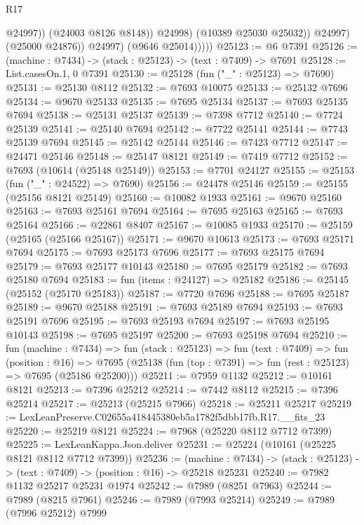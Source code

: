 \begin{lexlean}{R17}
\begin{coremodule}
                            @24997))
                        (@24003 @8126 @8148))
                      @24998)
                    (@10389 @25030 @25032))
                  @24997)
                (@25000 @24876))
              @24997)
            (@9646 @25014)))))
@25123 := @6 @7391
@25126 := (machine : @7434) -> (stack : @25123) -> (text : @7409) -> @7691
@25128 := List.casesOn.{1, 0} @7391
@25130 := @25128 (fun ("_" : @25123) => @7690)
@25131 := @25130 @8112
@25132 := @7693 @10075
@25133 := @25132 @7696
@25134 := @9670 @25133
@25135 := @7695 @25134
@25137 := @7693 @25135 @7694
@25138 := @25131 @25137
@25139 := @7398 @7712
@25140 := @7724 @25139
@25141 := @25140 @7694
@25142 := @7722 @25141
@25144 := @7743 @25139 @7694
@25145 := @25142 @25144
@25146 := @7423 @7712
@25147 := @24471 @25146
@25148 := @25147 @8121
@25149 := @7419 @7712
@25152 := @7693 (@10614 (@25148 @25149))
@25153 := @7701 @24127
@25155 := @25153 (fun ("_" : @24522) => @7690)
@25156 := @24478 @25146
@25159 := @25155 (@25156 @8121 @25149)
@25160 := @10082 @1933
@25161 := @9670 @25160
@25163 := @7693 @25161 @7694
@25164 := @7695 @25163
@25165 := @7693 @25164
@25166 := @22861 @8407
@25167 := @10085 @1933
@25170 := @25159 (@25165 (@25166 @25167))
@25171 := @9670 @10613
@25173 := @7693 @25171 @7694
@25175 := @7693 @25173 @7696
@25177 := @7693 @25175 @7694
@25179 := @7693 @25177 @10143
@25180 := @7695 @25179
@25182 := @7693 @25180 @7694
@25183 := fun (items : @24127) => @25182
@25186 := @25145 (@25152 (@25170 @25183))
@25187 := @7720 @7696
@25188 := @7695 @25187
@25189 := @9670 @25188
@25191 := @7693 @25189 @7694
@25193 := @7693 @25191 @7696
@25195 := @7693 @25193 @7694
@25197 := @7693 @25195 @10143
@25198 := @7695 @25197
@25200 := @7693 @25198 @7694
@25210 := fun (machine : @7434) =>
  fun (stack : @25123) =>
  fun (text : @7409) =>
  fun (position : @16) =>
  @7695 (@25138 (fun (top : @7391) => fun (rest : @25123) => @7695 (@25186 @25200)))
@25211 := @7959 @1132
@25212 := @10161 @8121
@25213 := @7396 @25212
@25214 := @7442 @8112
@25215 := @7396 @25214
@25217 := @25213 (@25215 @7966)
@25218 := @25211 @25217
@25219 := LexLeanPreserve.C02655a418445380eb5a1782f5dbb17fb.R17.__fits_23
@25220 := @25219 @8121
@25224 := @7968 (@25220 @8112 @7712 @7399)
@25225 := LexLeanKappa.Json.deliver
@25231 := @25224 (@10161 (@25225 @8121 @8112 @7712 @7399))
@25236 := (machine : @7434) ->
  (stack : @25123) -> (text : @7409) -> (position : @16) -> @25218 @25231
@25240 := @7982 @1132 @25217 @25231 @1974
@25242 := @7989 (@8251 @7963)
@25244 := @7989 (@8215 @7961)
@25246 := @7989 (@7993 @25214)
@25249 := @7989 (@7996 @25212) @7999

\end{coremodule}
\end{lexlean}
